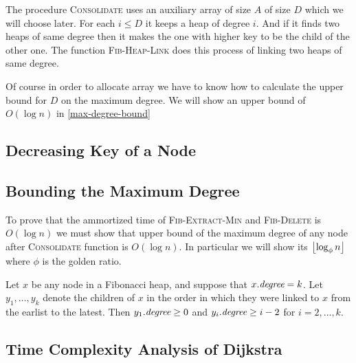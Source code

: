 The procedure \textsc{Consolidate} uses an auxiliary array of size $A$ of size $D$ which we will choose later. For each $i\leq D$ it keeps a heap of degree $i$. And if it finds two heaps of same degree then it makes the one with higher key to be the child of the other one. The function \textsc{Fib-Heap-Link} does this process of linking two heaps of same degree.

Of course in order to allocate array we have to know how to calculate the upper bound for $D$ on the maximum degree. We will show an upper bound of $O(\log n)$ in \autoref{max-degree-bound}


\subsection{Decreasing Key of a Node}

\subsection{Bounding the Maximum Degree}\label{max-degree-bound}
To prove that the ammortized time of \textsc{Fib-Extract-Min} and \textsc{Fib-Delete} is $O(\log n)$ we must show that upper bound of the maximum degree of any node after \textsc{Consolidate} function is $O(\log n)$. In particular we will show its $\left\lfloor \log_{\phi}n\right\rfloor$ where $\phi$ is the golden ratio.
\begin{lemma}{}{}
Let $x$ be any node in a Fibonacci heap, and suppose that $x.\emph{degree}=k$. Let $y_1,\dots, y_k$ denote the children of $x$ in the order in which they were linked to $x$ from the earlist to the latest. Then $y_1.\emph{degree}\geq 0$ and $y_i.\emph{degree}\geq i-2$ for $i=2,\dots, k$.
\end{lemma}

\subsection{Time Complexity Analysis of Dijkstra}
